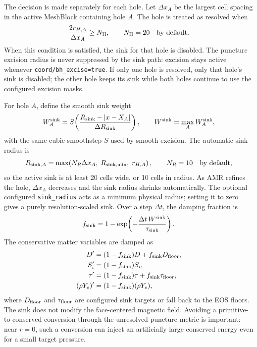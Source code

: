 \documentclass[11pt]{article}
\begin{document}
The decision is made separately for each hole.  Let
\(\Delta x_A\) be the largest cell spacing in the active MeshBlock containing
hole \(A\).  The hole is treated as resolved when
\begin{equation}
  \frac{2r_{H,A}}{\Delta x_A} \ge N_{\rm H},
  \qquad N_{\rm H}=20 \quad \hbox{by default}.
\end{equation}
When this condition is satisfied, the sink for that hole is disabled.  The
puncture excision radius is never suppressed by the sink path: excision stays
active whenever \texttt{coord/bh\_excise=true}.  If only one hole is resolved,
only that hole's sink is disabled; the other hole keeps its sink while both
holes continue to use the configured excision masks.

For hole \(A\), define the smooth sink weight
\begin{equation}
  W_A^{\rm sink}
  =
  S\!\left(\frac{R_{\rm sink}-|x-X_A|}{\Delta R_{\rm sink}}\right),
  \qquad
  W^{\rm sink} = \max_A W_A^{\rm sink},
\end{equation}
with the same cubic smoothstep \(S\) used by smooth excision.  The automatic
sink radius is
\begin{equation}
  R_{{\rm sink},A}
  =
  \max\!\left(
    N_R \Delta x_A,\;
    R_{\rm sink,min},\;
    r_{H,A}
  \right),
  \qquad N_R=10 \quad \hbox{by default},
\end{equation}
so the active sink is at least 20 cells wide, or 10 cells in radius.  As AMR
refines the hole, \(\Delta x_A\) decreases and the sink radius shrinks
automatically.  The optional configured \texttt{sink\_radius} acts as a
minimum physical radius; setting it to zero gives a purely resolution-scaled
sink.  Over a step \(\Delta t\), the damping fraction is
\begin{equation}
  f_{\rm sink}
  =
  1-\exp\!\left(-\frac{\Delta t\,W^{\rm sink}}{\tau_{\rm sink}}\right).
\end{equation}
The conservative matter variables are damped as
\begin{align}
  D' &= (1-f_{\rm sink})D + f_{\rm sink}D_{\rm floor},\\
  S'_i &= (1-f_{\rm sink})S_i,\\
  \tau' &= (1-f_{\rm sink})\tau + f_{\rm sink}\tau_{\rm floor},\\
  (\rho Y_s)' &= (1-f_{\rm sink})(\rho Y_s),
\end{align}
where \(D_{\rm floor}\) and \(\tau_{\rm floor}\) are configured sink targets
or fall back to the EOS floors.  The sink does not modify the face-centered
magnetic field.  Avoiding a primitive-to-conserved conversion through the
unresolved puncture metric is important: near \(r=0\), such a conversion can
inject an artificially large conserved energy even for a small target
pressure.
\end{document}
